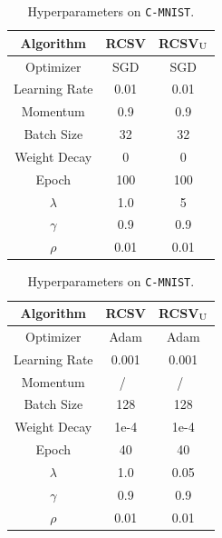\begin{table}[htbp]
	\begin{minipage}{0.5\linewidth}
		\caption{Hyperparameters on \texttt{Toy example}.}
		\label{tbl:hyper_toy}
		\centering
		\begin{tabular}{c c c}
			\hline
			Algorithm & RCSV    & RCSV$_{\rm U}$ \\
			\hline
			Optimizer     &  SGD       & SGD  \\
			Learning Rate &  0.01      & 0.01 \\
			Momentum      &  0.9       & 0.9  \\
			Batch Size    &  32        & 32   \\
			Weight Decay  &  0         & 0     \\
			Epoch         &  100       & 100   \\
			$\lambda$     &  1.0       & 5   \\
			$\gamma$      &  0.9       & 0.9  \\
			$\rho$        &  0.01      & 0.01  \\ 
			\hline
		\end{tabular}
	\end{minipage}
	\begin{minipage}{0.5\linewidth}
		\caption{Hyperparameters on \texttt{C-MNIST}.}
		\label{tbl:hyper_mnist}
		\centering
		\begin{tabular}{c c c}
			\hline
			Algorithm & RCSV    & RCSV$_{\rm U}$ \\
			\hline
			Optimizer     &  Adam      & Adam  \\
			Learning Rate &  0.001      & 0.001 \\
			Momentum      &  /\         & /\  \\
			Batch Size    &  128        & 128   \\
			Weight Decay  &  1e-4       & 1e-4     \\
			Epoch         &  40         & 40   \\
			$\lambda$     &  1.0        & 0.05   \\
			$\gamma$      &  0.9        & 0.9  \\
			$\rho$        &  0.01       & 0.01  \\ 
			\hline
		\end{tabular}
	\end{minipage}
\end{table}
